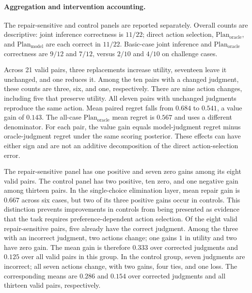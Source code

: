 \paragraph{Aggregation and intervention accounting.}
The repair-sensitive and control panels are reported separately. Overall
counts are descriptive: joint inference correctness is $11/22$;
direct action selection, $\mathrm{Plan}_{\mathrm{oracle}}$, and
$\mathrm{Plan}_{\mathrm{model}}$ are each correct in $11/22$. Basic-case joint inference and $\mathrm{Plan}_{\mathrm{oracle}}$ correctness
are $9/12$ and $7/12$, versus $2/10$ and $4/10$ on challenge cases.

Across 21 valid pairs, three replacements increase utility, seventeen leave
it unchanged, and one reduces it. Among the ten pairs with a changed
judgment, these counts are three, six, and one, respectively. There are nine
action changes, including five that preserve utility. All eleven pairs with
unchanged judgments reproduce the same action. Mean paired regret falls
from $0.684$ to $0.541$, a value gain of $0.143$. The all-case
$\mathrm{Plan}_{\mathrm{oracle}}$ mean regret is $0.567$ and uses a different denominator.
For each pair, the value gain equals model-judgment regret minus
oracle-judgment regret under the same scoring posterior. These effects can
have either sign and are not an additive decomposition of the direct
action-selection error.

The repair-sensitive panel has one positive and seven zero gains among its
eight valid pairs. The control panel has two positive, ten zero, and one
negative gain among thirteen pairs. In the single-choice elimination layer,
mean repair gain is $0.667$ across six cases, but two of its three positive
gains occur in controls. This distinction prevents improvements in controls
from being presented as evidence that the task requires preference-dependent
action selection.
Of the eight valid repair-sensitive pairs, five already have the correct
judgment. Among the three with an incorrect judgment, two actions change;
one gains $1$ in utility and two have zero gain. The mean gain is therefore
$0.333$ over corrected judgments and $0.125$ over all valid pairs in this
group. In the control group, seven judgments are incorrect; all seven
actions change, with two gains, four ties, and one loss. The corresponding
means are $0.286$ and $0.154$ over corrected judgments and all thirteen
valid pairs, respectively.

